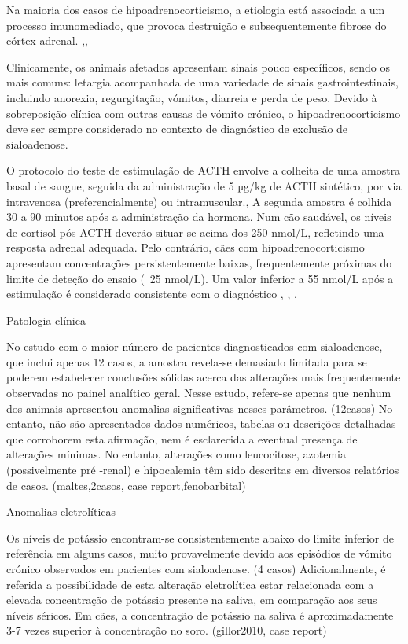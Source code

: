 Na maioria dos casos de hipoadrenocorticismo, a etiologia está associada a um processo imunomediado, que provoca destruição e subsequentemente fibrose do córtex adrenal. \cite{Wakayama2017},\cite{Spence2018},\cite{Mooney2023} 


Clinicamente, os animais afetados apresentam sinais pouco específicos, sendo os mais comuns: letargia acompanhada de uma variedade de sinais gastrointestinais, incluindo anorexia, regurgitação, vómitos, diarreia e perda de peso. \cite{Guzman-Ramos2022} Devido à sobreposição clínica com outras causas de vómito crónico, o hipoadrenocorticismo deve ser sempre considerado no contexto de diagnóstico de exclusão de sialoadenose.


O protocolo do teste de estimulação de ACTH envolve a colheita de uma amostra basal de sangue, seguida da administração de 5 µg/kg de ACTH sintético, por via intravenosa (preferencialmente) ou intramuscular.\cite{Spence2018}, \cite{Mooney2023} A segunda amostra é colhida 30 a 90 minutos após a administração da hormona. \cite{Spence2018}
Num cão saudável, os níveis de cortisol pós-ACTH deverão situar-se acima dos 250 nmol/L, refletindo uma resposta adrenal adequada. \cite{Mooney2023} Pelo contrário, cães com hipoadrenocorticismo apresentam concentrações persistentemente baixas, frequentemente próximas do limite de deteção do ensaio (~25 nmol/L). \cite{Mooney2023} Um valor inferior a 55 nmol/L após a estimulação é considerado consistente com o diagnóstico \cite{Wakayama2017}, \cite{Mooney2023}, \cite{Guzman-Ramos2022}.

Patologia clínica


No estudo com o maior número de pacientes diagnosticados com sialoadenose, que inclui apenas 12 casos, a amostra revela-se demasiado limitada para se poderem estabelecer conclusões sólidas acerca das alterações mais frequentemente observadas no painel analítico geral. Nesse estudo, refere-se apenas que nenhum dos animais apresentou anomalias significativas nesses parâmetros. (12casos) No entanto, não são apresentados dados numéricos, tabelas ou descrições detalhadas que corroborem esta afirmação, nem é esclarecida a eventual presença de alterações mínimas.
No entanto, alterações como leucocitose, azotemia (possivelmente pré -renal) e hipocalemia têm sido descritas em diversos relatórios de casos. (maltes,2casos, case report,fenobarbital)


Anomalias eletrolíticas


Os níveis de potássio encontram-se consistentemente abaixo do limite inferior de referência em alguns casos, muito provavelmente devido aos episódios de vómito crónico observados em pacientes com sialoadenose. (4 casos) Adicionalmente, é referida a possibilidade de esta alteração eletrolítica estar relacionada com a elevada concentração de potássio presente na saliva, em comparação aos seus níveis séricos. Em cães, a concentração de potássio na saliva é aproximadamente 3-7 vezes superior à concentração no soro. (gillor2010, case report)


